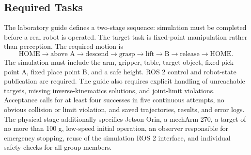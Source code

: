 \documentclass[UTF8,zihao=-4,scheme=chinese,fontset=none]{ctexart}
\begin{document}
\subsection{Required Tasks}
The laboratory guide defines a two-stage sequence: simulation must be completed before a real robot is operated. The target task is fixed-point manipulation rather than perception. The required motion is
\begin{equation}
\text{HOME}\rightarrow\text{above A}\rightarrow\text{descend}\rightarrow\text{grasp}\rightarrow\text{lift}\rightarrow\text{B}\rightarrow\text{release}\rightarrow\text{HOME}.
\end{equation}
The simulation must include the arm, gripper, table, target object, fixed pick point A, fixed place point B, and a safe height. ROS 2 control and robot-state publication are required. The guide also requires explicit handling of unreachable targets, missing inverse-kinematics solutions, and joint-limit violations. Acceptance calls for at least four successes in five continuous attempts, no obvious collision or limit violation, and saved trajectories, results, and error logs. The physical stage additionally specifies Jetson Orin, a mechArm 270, a target of no more than 100 g, low-speed initial operation, an observer responsible for emergency stopping, reuse of the simulation ROS 2 interface, and individual safety checks for all group members\cite{guide}.
\end{document}
